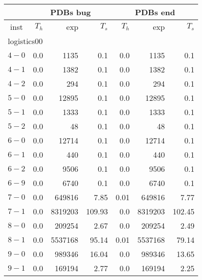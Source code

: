 \begin{longtable}{|c||r|r|r||r|r|r|}\firsthline
& \multicolumn{3}{c||}{PDBs bug} & \multicolumn{3}{c||}{PDBs end}\\\hline
inst & $T_h$ & exp & $T_s$ & $T_h$ & exp & $T_s$\\\hline
\multicolumn{7}{|l|}{logistics00}\\\hline
$4-0$ & 0.0 & 1135 & 0.1 &0.0 & 1135 & 0.1 \\\hline
$4-1$ & 0.0 & 1382 & 0.1 &0.0 & 1382 & 0.1 \\\hline
$4-2$ & 0.0 & 294 & 0.1 &0.0 & 294 & 0.1 \\\hline
$5-0$ & 0.0 & 12895 & 0.1 &0.0 & 12895 & 0.1 \\\hline
$5-1$ & 0.0 & 1333 & 0.1 &0.0 & 1333 & 0.1 \\\hline
$5-2$ & 0.0 & 48 & 0.1 &0.0 & 48 & 0.1 \\\hline
$6-0$ & 0.0 & 12714 & 0.1 &0.0 & 12714 & 0.1 \\\hline
$6-1$ & 0.0 & 440 & 0.1 &0.0 & 440 & 0.1 \\\hline
$6-2$ & 0.0 & 9506 & 0.1 &0.0 & 9506 & 0.1 \\\hline
$6-9$ & 0.0 & 6740 & 0.1 &0.0 & 6740 & 0.1 \\\hline
$7-0$ & 0.0 & 649816 & 7.85 &0.01 & 649816 & 7.77 \\\hline
$7-1$ & 0.0 & 8319203 & 109.93 &0.0 & 8319203 & 102.45 \\\hline
$8-0$ & 0.0 & 209254 & 2.67 &0.0 & 209254 & 2.49 \\\hline
$8-1$ & 0.0 & 5537168 & 95.14 &0.01 & 5537168 & 79.14 \\\hline
$9-0$ & 0.0 & 989346 & 16.04 &0.0 & 989346 & 13.65 \\\hline
$9-1$ & 0.0 & 169194 & 2.77 &0.0 & 169194 & 2.25 \\\hline


\end{longtable}
